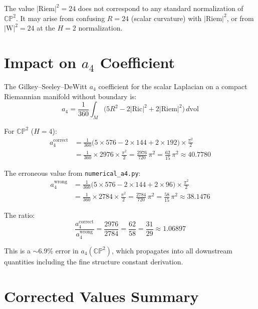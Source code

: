 \documentclass[11pt]{article}
\newcommand{\Riem}{\mathrm{Riem}}
\newcommand{\Ric}{\mathrm{Ric}}
\newcommand{\Weyl}{\mathrm{W}}
\begin{document}
The value $|\Riem|^2 = 24$ does not correspond to any standard normalization of
$\mathbb{CP}^2$. It may arise from confusing $R = 24$ (scalar curvature) with
$|\Riem|^2$, or from $|\Weyl|^2 = 24$ at the $H=2$ normalization.

\section{Impact on $a_4$ Coefficient}

The Gilkey--Seeley--DeWitt $a_4$ coefficient for the scalar Laplacian on a compact
Riemannian manifold without boundary is:
\begin{equation}
  a_4 = \frac{1}{360}\int_M
  \bigl(5R^2 - 2|\Ric|^2 + 2|\Riem|^2\bigr)\,d\mathrm{vol}
\end{equation}

For $\mathbb{CP}^2$ ($H=4$):
\begin{align}
  a_4^{\text{correct}} &= \frac{1}{360}\bigl(5\times 576 - 2\times 144
                          + 2\times 192\bigr)\times\frac{\pi^2}{2} \\
                       &= \frac{1}{360}\times 2976 \times \frac{\pi^2}{2}
                        = \frac{2976}{720}\,\pi^2
                        = \frac{62}{15}\,\pi^2
                        \approx 40.7780
\end{align}

The erroneous value from \texttt{numerical\_a4.py}:
\begin{align}
  a_4^{\text{wrong}} &= \frac{1}{360}\bigl(5\times 576 - 2\times 144
                         + 2\times 96\bigr)\times\frac{\pi^2}{2} \\
                      &= \frac{1}{360}\times 2784 \times \frac{\pi^2}{2}
                       = \frac{2784}{720}\,\pi^2
                       = \frac{58}{15}\,\pi^2
                       \approx 38.1476
\end{align}

The ratio:
\begin{equation}
  \frac{a_4^{\text{correct}}}{a_4^{\text{wrong}}}
  = \frac{2976}{2784} = \frac{62}{58} = \frac{31}{29} \approx 1.06897
\end{equation}

This is a $\sim 6.9\%$ error in $a_4(\mathbb{CP}^2)$, which propagates into all
downstream quantities including the fine structure constant derivation.

\section{Corrected Values Summary}
\end{document}
